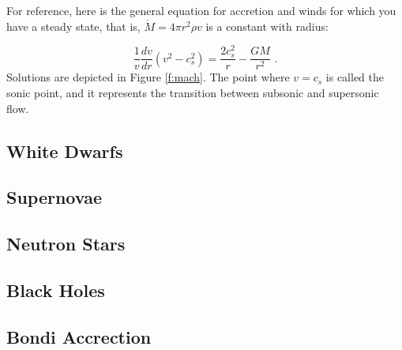 For reference, here is the general equation for accretion and winds for which you have a steady state, that is, $\dot{M} = 4 \pi r^2 \rho v$ is a constant with radius:

\begin{equation}
\frac{1}{v} \frac{dv}{dr} (v^2 - c_s^2) = \frac{2 c_s^2}{r} - \frac{G M}{r^2}\,\,.
\end{equation}
Solutions are depicted in Figure \ref{f:mach}. The point where $v = c_s$ is called the sonic point, and it represents the transition between subsonic and supersonic flow.

\subsection{White Dwarfs}

\subsection{Supernovae}

\subsection{Neutron Stars}

\subsection{Black Holes}


\subsection{Bondi Accrection}

